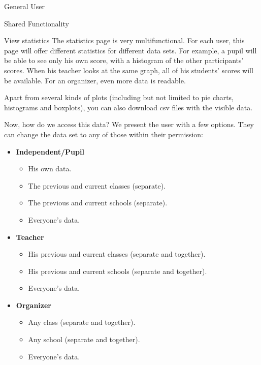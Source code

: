 \begin{section}{General User}
\begin{subsection}{Shared Functionality}
        \begin{subsubsection}{View statistics}
            The statistics page is very multifunctional. For each user, this
            page will offer different statistics for different data sets. For
            example, a pupil will be able to see only his own score, with a
            histogram of the other participants' scores. When his teacher looks
            at the same graph, all of his students' scores will be available.
            For an organizer, even more data is readable.

            Apart from several kinds of plots (including but not limited to pie
            charts, histograms and boxplots), you can also download csv files
            with the visible data.

            Now, how do we access this data? We present the user with a few
            options. They can change the data set to any of those within their
            permission:

            \begin{itemize}
                \item \textbf{Independent/Pupil}
                    \begin{itemize}
                        \item His own data.
                        \item The previous and current classes (separate).
                        \item The previous and current schools (separate).
                        \item Everyone's data.
                    \end{itemize}
                \item \textbf{Teacher}
                    \begin{itemize}
                        \item His previous and current classes (separate and
                            together).
                        \item His previous and current schools (separate and
                            together).
                        \item Everyone's data.
                    \end{itemize}
                \item \textbf{Organizer}
                    \begin{itemize}
                        \item Any class (separate and together).
                        \item Any school (separate and together).
                        \item Everyone's data.
                    \end{itemize}
            \end{itemize}


\end{subsubsection}
\end{subsection}
\end{section}
